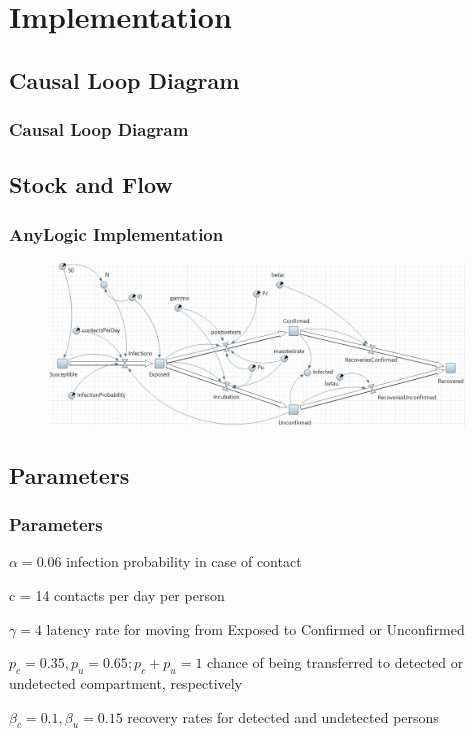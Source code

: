 \documentclass{beamer}
\begin{document}

\section{Implementation}
\subsection{Causal Loop Diagram}
\begin{frame}
\frametitle{Causal Loop Diagram}
  

\end{frame}


\subsection{Stock and Flow}
\begin{frame}
\frametitle{AnyLogic Implementation}

\begin{figure}[h!]
\includegraphics[width=110mm, scale = 0.5]{AnyLogicSIR}
\end{figure}
\end{frame}

\subsection{Parameters}
\begin{frame}
\frametitle{Parameters}
\begin{block}{$\alpha = 0.06$}
  infection probability in case of contact
\end{block}

\begin{block}{c = 14}
  contacts per day per person
\end{block}

\begin{block}{$\gamma = 4$}
  latency rate for moving from Exposed to Confirmed or Unconfirmed
\end{block}

\begin{block}{$p_c = 0.35, p_u = 0.65; p_c + p_u = 1$}
  chance of being transferred to detected or undetected compartment, respectively
\end{block}

\begin{block}{$\beta_c = 0.1, \beta_u = 0.15$}
  recovery rates for detected and undetected persons
\end{block}
\end{frame}
\end{document}
